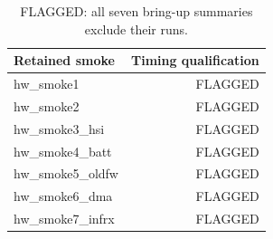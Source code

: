 \begin{table}[H]
\centering\small
\caption{FLAGGED: all seven bring-up summaries exclude their runs.}\label{tab:smoke}
\begin{tabular}{lr}
\toprule
Retained smoke & Timing qualification \\
\midrule
hw\_smoke1 & FLAGGED \\
hw\_smoke2 & FLAGGED \\
hw\_smoke3\_hsi & FLAGGED \\
hw\_smoke4\_batt & FLAGGED \\
hw\_smoke5\_oldfw & FLAGGED \\
hw\_smoke6\_dma & FLAGGED \\
hw\_smoke7\_infrx & FLAGGED \\
\bottomrule
\end{tabular}
\end{table}

